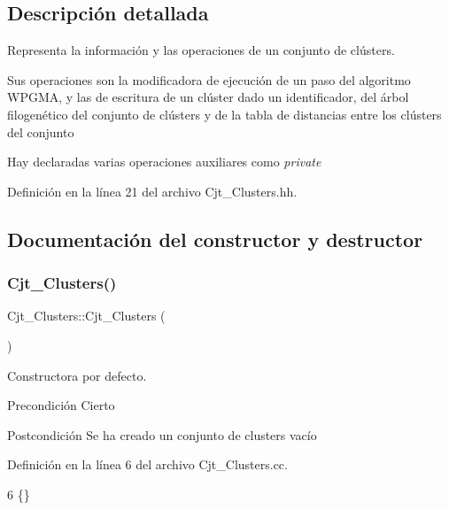 \subsection{Descripción detallada}
Representa la información y las operaciones de un conjunto de clústers. 

Sus operaciones son la modificadora de ejecución de un paso del algoritmo W\+P\+G\+MA, y las de escritura de un clúster dado un identificador, del árbol filogenético del conjunto de clústers y de la tabla de distancias entre los clústers del conjunto

Hay declaradas varias operaciones auxiliares como {\itshape private} 

Definición en la línea 21 del archivo Cjt\+\_\+\+Clusters.\+hh.



\subsection{Documentación del constructor y destructor}
\mbox{\label{class_cjt___clusters_a2e55759944a78043744103e19dd87c1c}} 
\subsubsection{\texorpdfstring{Cjt\+\_\+\+Clusters()}{Cjt\_Clusters()}\hspace{0.1cm}{\footnotesize\ttfamily [1/2]}}
{\footnotesize\ttfamily Cjt\+\_\+\+Clusters\+::\+Cjt\+\_\+\+Clusters (\begin{DoxyParamCaption}{ }\end{DoxyParamCaption})}



Constructora por defecto. 

\begin{DoxyPrecond}{Precondición}
Cierto 
\end{DoxyPrecond}
\begin{DoxyPostcond}{Postcondición}
Se ha creado un conjunto de clusters vacío 
\end{DoxyPostcond}


Definición en la línea 6 del archivo Cjt\+\_\+\+Clusters.\+cc.


\begin{DoxyCode}
6 \{\}
\end{DoxyCode}
\mbox{\label{class_cjt___clusters_a11e683ee54988d48d34c9cb2f6d52be6}} 
